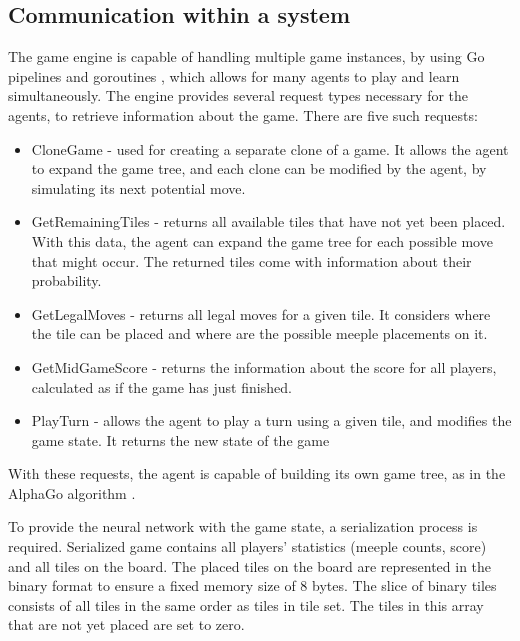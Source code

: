 \subsection{Communication within a system}

The game engine is capable of handling multiple game instances, by using Go pipelines and goroutines \cite{GolangPipeline}, which allows for many agents to play and learn simultaneously. The engine provides several request types necessary for the agents, to retrieve information about the game. There are five such requests:
\begin{itemize}
    \item CloneGame - used for creating a separate clone of a game. It allows the agent to expand the game tree, and each clone can be modified by the agent, by simulating its next potential move.
    \item GetRemainingTiles - returns all available tiles that have not yet been placed. With this data, the agent can expand the game tree for each possible move that might occur. The returned tiles come with information about their probability.
    \item GetLegalMoves - returns all legal moves for a given tile. It considers where the tile can be placed and where are the possible meeple placements on it.
    \item GetMidGameScore - returns the information about the score for all players, calculated as if the game has just finished.
    \item PlayTurn - allows the agent to play a turn using a given tile, and modifies the game state. It returns the new state of the game 
\end{itemize}

With these requests, the agent is capable of building its own game tree, as in the AlphaGo algorithm \cite{AlphaGoAlgorithm}.

To provide the neural network with the game state, a serialization process is required. Serialized game contains all players' statistics (meeple counts, score) and all tiles on the board. The placed tiles on the board are represented in the binary format to ensure a fixed memory size of 8 bytes. The slice of binary tiles consists of all tiles in the same order as tiles in tile set. The tiles in this array that are not yet placed are set to zero.

